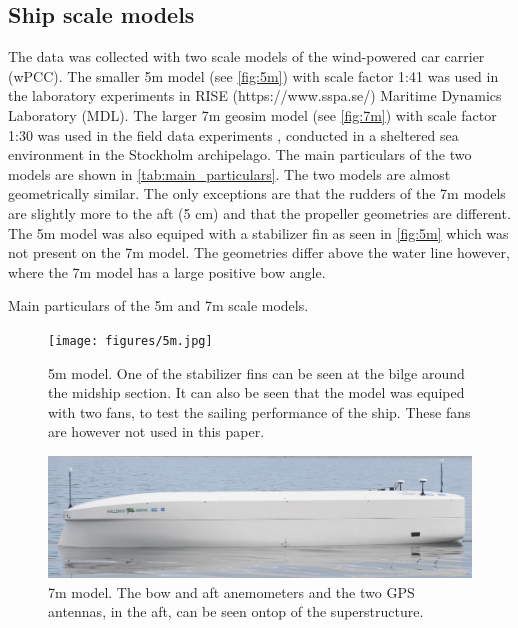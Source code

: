 \subsection{Ship scale models}
\label{sec:ship_scale_models}
The data was collected with two scale models of the wind-powered car carrier (wPCC). The smaller 5m model (see \autoref{fig:5m}) with scale factor 1:41 was used in the laboratory experiments in RISE (https://www.sspa.se/) Maritime Dynamics Laboratory (MDL). The larger 7m geosim model (see \autoref{fig:7m}) with scale factor 1:30 was used in the field data experiments \citep{hillenbrand_development_2021}, conducted in a sheltered sea environment in the Stockholm archipelago. The main particulars of the two models are shown in \autoref{tab:main_particulars}. The two models are almost geometrically similar. The only exceptions are that the rudders of the 7m models are slightly more to the aft (5 cm) and that the propeller geometries are different. The 5m model was also equiped with a stabilizer fin as seen in \autoref{fig:5m} which was not present on the 7m model. The geometries differ above the water line however, where the 7m model has a large positive bow angle.

\begin{table}[!ht]
    \centering
    \caption{Main particulars of the 5m and 7m scale models.}
    \label{tab:main_particulars}
\end{table}

\begin{figure}[!ht]
    \texttt{[image: figures/5m.jpg]}
    \caption{5m model. One of the stabilizer fins can be seen at the bilge around the midship section. It can also be seen that the model was equiped with two fans, to test the sailing performance of the ship. These fans are however not used in this paper.}
    \label{fig:5m}
\end{figure}

\begin{figure}[!ht]
    \includegraphics[width=\textwidth]{figures/7m.jpg}
    \caption{7m model. The bow and aft anemometers and the two GPS antennas, in the aft, can be seen ontop of the superstructure.}
    \label{fig:7m}
\end{figure}